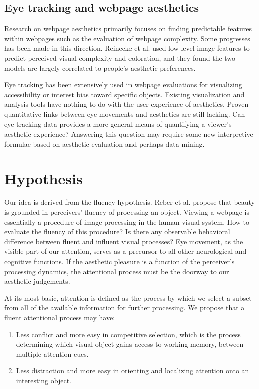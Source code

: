 \subsection{Eye tracking and webpage aesthetics}
Research on webpage aesthetics primarily focuses on finding predictable features within webpages such as the evaluation of webpage complexity\cite{Deng2010}.
Some progresses has been made in this direction\cite{Ivory}\cite{Zheng}.
Reinecke et al.\cite{Reinecke} used low-level image features to predict perceived visual complexity and coloration, and they found the two models are largely correlated to people's aesthetic preferences.

Eye tracking has been extensively used in webpage evaluations for visualizing accessibility or interest bias toward specific objects.
Existing visualization and analysis tools have nothing to do with the user experience of aesthetics.
Proven quantitative links between eye movements and aesthetics are still lacking\cite{Santella}.
Can eye-tracking data provides a more general means of quantifying a viewer's aesthetic experience?
Answering this question may require some new interpretive formulae based on aesthetic evaluation and perhaps data mining.

\section{Hypothesis}
\label{sec:hyp}
Our idea is derived from the fluency hypothesis.
Reber et al.\cite{Reber2004} propose that beauty is grounded in perceivers' fluency of processing an object.
Viewing a webpage is essentially a procedure of image processing in the human visual system.
How to evaluate the fluency of this procedure?
Is there any observable behavioral difference between fluent and influent visual processes? 
Eye movement, as the visible part of our attention, serves as a precursor to all other neurological and cognitive functions.
If the aesthetic pleasure is a function of the perceiver's processing dynamics\cite{Reber2004}, the attentional process must be the doorway to our aesthetic judgements.

At its most basic, attention is defined as the process by which we select a subset from all of the available information for further processing\cite{Eriksen1972}.
We propose that a fluent attentional process may have:
\begin{enumerate}
  \item Less conflict and more easy in competitive selection, which is the process determining which visual object gains access to working memory, between multiple attention cues.
  \item Less distraction and more easy in orienting and localizing attention onto an interesting object.
\end{enumerate}

